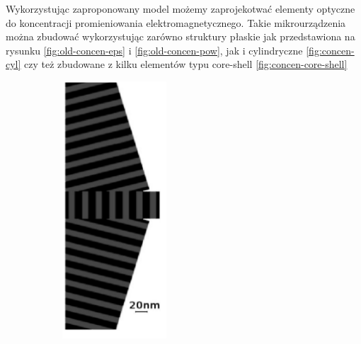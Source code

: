 Wykorzystując zaproponowany model możemy zaprojekotwać elementy optyczne do koncentracji promieniowania elektromagnetycznego. Takie mikrourządzenia można zbudować wykorzystując zarówno struktury płaskie jak przedstawiona na rysunku \ref{fig:old-concen-eps} i \ref{fig:old-concen-pow}, jak i cylindryczne \ref{fig:concen-cyl} czy też zbudowane z kilku elementów typu core-shell \ref{fig:concen-core-shell}
\begin{figure}[!htb]
	\centering
	\begin{subfigure}[b]{.45\textwidth}
		\includegraphics[angle=90,width=\textwidth]{images/multilayer/konc_eps_mgr.png}

\end{subfigure}
\end{figure}
